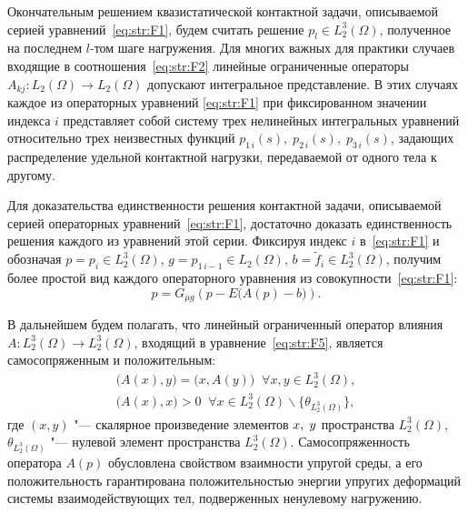 Окончательным решением квазистатической контактной задачи, описываемой серией уравнений~\eqref{eq:str:F1}, будем считать решение $p_{l} \in L_{2}^{3} (\Omega)$, полученное на последнем $l$-том шаге нагружения.
Для многих важных для практики случаев входящие в соотношения~\eqref{eq:str:F2} линейные ограниченные операторы $A_{kj} \colon L_{2}  (\Omega)\to L_{2}  (\Omega)$ допускают интегральное представление.
В этих случаях каждое из операторных уравнений \eqref{eq:str:F1} при фиксированном значении индекса $i$ представляет собой систему трех нелинейных интегральных уравнений относительно трех неизвестных функций $p_{1\,i} (s), \; p_{2\,i} (s), \; p_{3\,i} (s)$, задающих распределение удельной контактной нагрузки, передаваемой от одного тела к другому.

\smallskip

Для доказательства единственности решения контактной задачи, описываемой серией операторных уравнений~\eqref{eq:str:F1}, достаточно доказать единственность решения каждого из уравнений этой серии.
Фиксируя индекс $i$ в~\eqref{eq:str:F1} и обозначая $p=p_{i} \in L_{2}^{3} (\Omega)$, $g=p_{1\,i-1} \in L_{2} (\Omega)$, $b=\tilde{f}_{i} \in L_{2}^{3} (\Omega)$, получим более простой вид каждого операторного уравнения из совокупности~\eqref{eq:str:F1}:
\begin{equation} 
p=G_{\mu g} \left(p-E  \bigl(A(p)-b\bigr)\right).
\label{eq:str:F5} 
\end{equation}

В дальнейшем будем полагать, что линейный ограниченный оператор влияния $A\colon L_{2}^{3} (\Omega)\to L_{2}^{3} (\Omega)$, входящий в уравнение~\eqref{eq:str:F5}, является самосопряженным и положительным:
\begin{equation} 
\label{eq:str:F6} 
\begin{array}{l} 
\bigl(A(x),y\bigr)=\bigl(x,A(y)\bigr) \; \; \forall x,y\in L_{2}^{3} (\Omega), 
\\[2mm] 
\bigl(A(x),x\bigr)> 0\; \; \forall x\in L_{2}^{3} (\Omega)\backslash \{\theta _{L_{2}^{3} (\Omega)} \}, 
\end{array}
 \end{equation} 
где $(x, y)$ "--- скалярное произведение элементов $x,{\rm \; }y$ пространства $L_{2}^{3} (\Omega)$, \linebreak 
$\theta _{L_{2}^{3} (\Omega)}$ "--- нулевой элемент пространства $L_{2}^{3} (\Omega)$.
Самосопряженность оператора $A(p)$ обусловлена свойством взаимности упругой среды, а его положительность гарантирована положительностью энергии упругих деформаций системы взаимодействующих тел, подверженных ненулевому нагружению.

